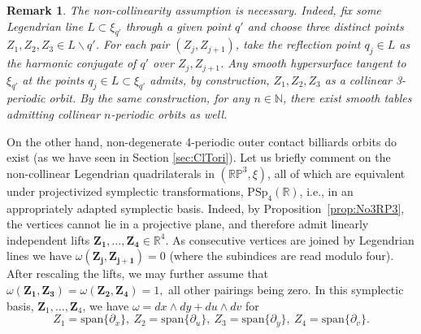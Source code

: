 \documentclass{article}
\newcommand{\R}{\mathbb{R}} %
\newtheorem{rmk}{Remark}
\begin{document}
\begin{rmk}
\label{rmk:collinear}
    The non-collinearity assumption is necessary. Indeed, fix some Legendrian line 
    $L\subset \xi_{q'}$ through a given point $q'$ and choose three distinct points 
    $Z_1,Z_2, Z_3\in L\backslash q'$. For each pair $(Z_j, Z_{j+1})$, take the reflection 
    point $q_j\in L$ as the harmonic conjugate of $q'$ over $Z_j, Z_{j+1}$. Any smooth 
    hypersurface tangent to $\xi_{q'}$ at the points $q_j\in L\subset \xi_{q'}$ admits, by 
    construction, $Z_1, Z_2, Z_3$ as a collinear 3-periodic orbit. By the same 
    construction, for any $n\in \mathbb{N}$, there exist smooth tables admitting collinear $n$-periodic orbits as well. %
\end{rmk}

On the other hand, non-degenerate 4-periodic outer contact billiards orbits do exist (as 
we have seen in Section \ref{sec:ClTori}). Let us briefly comment on the non-collinear 
Legendrian quadrilaterals in $(\mathbb{RP}^3,\xi)$, all of which are equivalent under 
projectivized symplectic transformations, $\text{PSp}_4(\R)$, i.e., in an appropriately 
adapted symplectic basis. Indeed, by Proposition~\ref{prop:No3RP3}, the vertices cannot 
lie in a projective plane, and therefore admit linearly independent lifts 
$\boldsymbol{Z_1}, \ldots , \boldsymbol{Z_4} \in \R^4$. As consecutive vertices are joined 
by Legendrian lines we have $\omega(\boldsymbol{Z_j}, \boldsymbol{Z_{j+1}})=0$ (where the 
subindices are read modulo four). After rescaling the lifts, we may further assume that 
$\omega(\boldsymbol{Z_1}, \boldsymbol{Z_3}) = \omega(\boldsymbol{Z_2}, \boldsymbol{Z_4}) 
=1,$ all other pairings being zero. In this symplectic basis, ${\boldsymbol{Z}}_1, \ldots, 
{\boldsymbol{Z}}_4$, we have $\omega = dx\wedge dy + du\wedge dv$ for 
\[ Z_1 = \text{span}\{ \partial_x \}, ~Z_2 = \text{span}\{ \partial_u\}, ~Z_3 = \text{span}\{ \partial_y\}, ~Z_4 = \text{span}\{ \partial_v\}. \]
\end{document}
